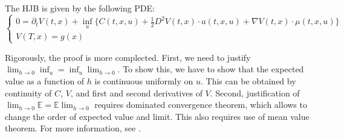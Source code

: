 \documentclass[11pt]{book}
\begin{document}
The HJB is given by the following PDE:
\begin{equation}\label{eqn:HJB}
    \begin{cases}
        0=\partial_t V(t,x)+\inf_{u}\Big\{C(t,x,u) +
         \frac12 D^2V(t,x) \cdot a(t,x,u) + \nabla V(t,x)\cdot \mu(t,x,u)\Big\}\\
         V(T,x)=g(x)
    \end{cases}
\end{equation}
\begin{rem}
    Rigorously, the proof is more complected. First, we need to justify $\lim_{h\to0}\inf_{u}=\inf_{u}\lim_{h\to0}$. To show this, we have to show that the expected value as a function of $h$ is continuous uniformly on $u$. This can be obtained by continuity of $C$, $V$, and first and second derivatives of $V$. Second, justification of $\lim_{h\to0}\mathbb{E}=\mathbb{E}\lim_{h\to0}$ requires dominated convergence theorem, which allows to change the order of expected value and limit. This also requires use of mean value theorem. For more information, see \cite{Touzi12}.
\end{rem}
\end{document}
